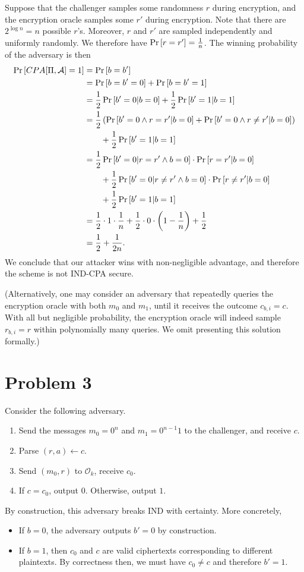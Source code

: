 \documentclass{article}
\theoremstyle{definition}
\begin{document}
Suppose that the challenger samples some randomness $r$ during encryption, and the encryption oracle samples some $r'$ during encryption.
Note that there are $2^{\log n} = n$ possible $r$'s.
Moreover, $r$ and $r'$ are sampled independently and uniformly randomly.
We therefore have $\Pr\left[r=r'\right]=\frac{1}{n}$.
The winning probability of the adversary is then
\begin{align*}
    \Pr\left[CPA[\Pi, \mathcal{A}] = 1\right] &= \Pr\left[b = b'\right] \\
    &=\Pr\left[b = b' = 0\right] + \Pr\left[b = b' = 1\right] \\
    &=\frac{1}{2} \Pr\left[b' = 0 | b = 0\right] + \frac{1}{2}\Pr\left[b' = 1 | b = 1\right] \\
    &=\frac{1}{2} \left(\Pr\left[b'=0 \wedge r=r' | b=0\right] + \Pr\left[b'=0 \wedge r\ne r' | b=0\right]\right) \\
    &\qquad + \frac{1}{2}\Pr\left[b' = 1 | b = 1\right]\\
    &= \frac{1}{2} \Pr\left[b'=0 | r=r' \wedge b=0\right]\cdot \Pr\left[r=r' | b=0\right] \\
    &\qquad + \frac{1}{2} \Pr\left[b'=0 | r\ne r' \wedge b=0\right]\cdot \Pr\left[r\ne r' | b=0\right] \\
    &\qquad + \frac{1}{2}\Pr\left[b' = 1 | b = 1\right] \\
    &=\frac{1}{2}\cdot1\cdot \frac{1}{n} + \frac{1}{2}\cdot 0\cdot \left(1-\frac{1}{n}\right) + \frac{1}{2} \\
    &= \frac{1}{2} + \frac{1}{2n}.
\end{align*}
We conclude that our attacker wins with non-negligible advantage, and therefore the scheme is not IND-CPA secure.

(Alternatively, one may consider an adversary that repeatedly queries the encryption oracle with both $m_0$ and $m_1$, until it receives the outcome $c_{b, i}=c$.
With all but negligible probability, the encryption oracle will indeed sample $r_{b, i}=r$ within polynomially many queries.
We omit presenting this solution formally.)

\section*{Problem 3}

Consider the following adversary.
\begin{enumerate}
    \item Send the messages $m_0=0^n$ and $m_1=0^{n-1}1$ to the challenger, and receive $c$.
    \item Parse $(r, a)\gets c$.
    \item Send $(m_0, r)$ to $\mathcal{O}_k$, receive $c_0$.
    \item If $c=c_0$, output $0$. Otherwise, output $1$.
\end{enumerate}
By construction, this adversary breaks IND with certainty.
More concretely, \begin{itemize}
    \item If $b=0$, the adversary outputs $b'=0$ by construction.
    \item If $b=1$, then $c_0$ and $c$ are valid ciphertexts corresponding to different plaintexts.
    By correctness then, we must have $c_0\ne c$ and therefore $b'=1$.
\end{itemize}
\end{document}
